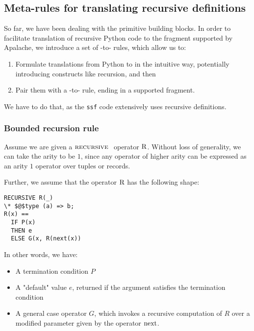 \subsection{Meta-rules for translating recursive definitions}

So far, we have been dealing with the primitive building blocks. In order to
facilitate translation of recursive Python code to the \tlap{} fragment
supported by Apalache, we introduce a set of \tlap{}-to-\tlap{} rules, which
allow us to:

\begin{enumerate}
  \item Formulate translations from Python to \tlap{} in the
    intuitive way, potentially introducing constructs like recursion, and then

  \item Pair them with a \tlap{}-to-\tlap{} rule, ending in a supported
      fragment.

\end{enumerate}

We have to do that, as the \texttt{ssf} code extensively uses recursive
definitions.

\subsubsection{Bounded recursion rule}

Assume we are given a $\textsc{recursive }$ operator $\mathrm{R}$. Without loss of generality,
we can take the arity to be $1$, since any operator of higher arity can be
expressed as an arity $1$ operator over tuples or records.

Further, we assume that the operator $\mathrm{R}$ has the following shape:

\begin{lstlisting}[language=tla,columns=fullflexible]
RECURSIVE R(_)
\* $@$type (a) => b;
R(x) ==
  IF P(x)
  THEN e
  ELSE G(x, R(next(x))
\end{lstlisting}
%

In other words, we have:

\begin{itemize}
  \item A termination condition $P$
  \item A "default" value $e$, returned if the argument satisfies the termination condition
  \item A general case operator $G$, which invokes a recursive computation of $R$ over a modified parameter given by the operator $\mathrm{next}$.
\end{itemize}
%

